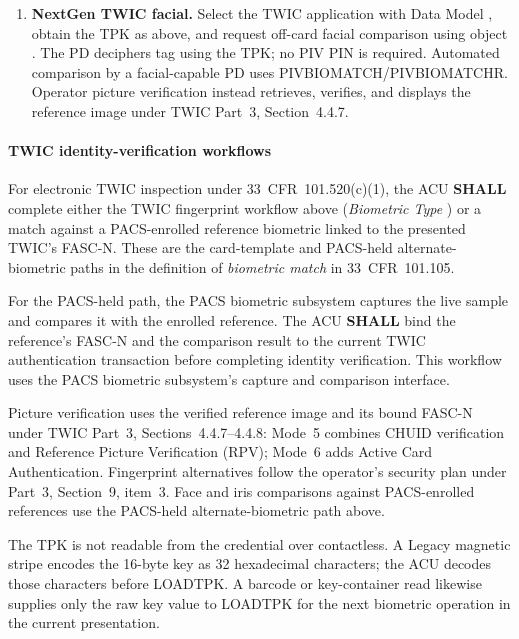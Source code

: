 \begin{enumerate}
    key when supplied by the ACU, then request off-card fingerprint comparison
    using object  and its encrypted tag  value.
    This workflow requires no PIV PIN.
  \item \textbf{NextGen TWIC facial.} Select the TWIC application with Data
    Model , obtain the TPK as above, and request off-card facial
    comparison using object . The PD deciphers tag 
    using the TPK; no PIV PIN is required. Automated comparison by a
    facial-capable PD uses PIVBIOMATCH/PIVBIOMATCHR. Operator picture
    verification instead retrieves, verifies, and displays the reference image
    under TWIC Part~3, Section~4.4.7.
\end{enumerate}

\paragraph{TWIC identity-verification workflows}
For electronic TWIC inspection under 33~CFR~101.520(c)(1), the ACU
\textbf{SHALL} complete either the TWIC fingerprint workflow above
(\emph{Biometric Type} ) or a match against a PACS-enrolled reference
biometric linked to the presented TWIC's FASC-N. These are the card-template
and PACS-held alternate-biometric paths in the definition of \emph{biometric match}
in 33~CFR~101.105.

For the PACS-held path, the PACS biometric subsystem captures the live sample
and compares it with the enrolled reference. The ACU \textbf{SHALL} bind the
reference's FASC-N and the comparison result to the current TWIC authentication
transaction before completing identity verification. This workflow uses the
PACS biometric subsystem's capture and comparison interface.

Picture verification uses the verified reference image and its bound FASC-N
under TWIC Part~3, Sections~4.4.7--4.4.8: Mode~5 combines CHUID verification
and Reference Picture Verification (RPV); Mode~6 adds Active Card Authentication.
Fingerprint alternatives follow the operator's security plan under Part~3,
Section~9, item~3. Face and iris comparisons against PACS-enrolled references
use the PACS-held alternate-biometric path above.

The TPK is not readable from the credential over contactless. A Legacy magnetic
stripe encodes the 16-byte key as 32 hexadecimal characters; the ACU decodes
those characters before LOADTPK. A barcode or key-container read likewise
supplies only the raw key value to LOADTPK for the next biometric operation
in the current presentation.

